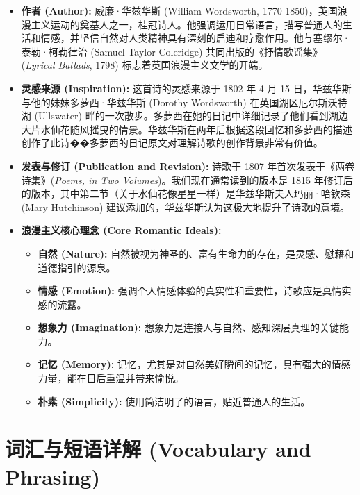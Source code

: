 \documentclass[12pt, a4paper]{article}
\begin{document}
\begin{itemize}
    \item \textbf{作者 (Author):} 威廉·华兹华斯 (William Wordsworth, 1770-1850)，英国浪漫主义运动的奠基人之一，桂冠诗人。他强调运用日常语言，描写普通人的生活和情感，并坚信自然对人类精神具有深刻的启迪和疗愈作用。他与塞缪尔·泰勒·柯勒律治 (Samuel Taylor Coleridge) 共同出版的《抒情歌谣集》(\textit{Lyrical Ballads}, 1798) 标志着英国浪漫主义文学的开端。
    \item \textbf{灵感来源 (Inspiration):} 这首诗的灵感来源于 1802 年 4 月 15 日，华兹华斯与他的妹妹多萝西·华兹华斯 (Dorothy Wordsworth) 在英国湖区厄尔斯沃特湖 (Ullswater) 畔的一次散步。多萝西在她的日记中详细记录了他们看到湖边大片水仙花随风摇曳的情景。华兹华斯在两年后根据这段回忆和多萝西的描述创作了此诗��多萝西的日记原文对理解诗歌的创作背景非常有价值。
    \item \textbf{发表与修订 (Publication and Revision):} 诗歌于 1807 年首次发表于《两卷诗集》(\textit{Poems, in Two Volumes})。我们现在通常读到的版本是 1815 年修订后的版本，其中第二节（关于水仙花像星星一样）是华兹华斯夫人玛丽·哈钦森 (Mary Hutchinson) 建议添加的，华兹华斯认为这极大地提升了诗歌的意境。
    \item \textbf{浪漫主义核心理念 (Core Romantic Ideals):}
        \begin{itemize}
            \item \textbf{自然 (Nature):} 自然被视为神圣的、富有生命力的存在，是灵感、慰藉和道德指引的源泉。
            \item \textbf{情感 (Emotion):} 强调个人情感体验的真实性和重要性，诗歌应是真情实感的流露。
            \item \textbf{想象力 (Imagination):} 想象力是连接人与自然、感知深层真理的关键能力。
            \item \textbf{记忆 (Memory):} 记忆，尤其是对自然美好瞬间的记忆，具有强大的情感力量，能在日后重温并带来愉悦。
            \item \textbf{朴素 (Simplicity):} 使用简洁明了的语言，贴近普通人的生活。
        \end{itemize}
\end{itemize}

\section{词汇与短语详解 (Vocabulary and Phrasing)}
\end{document}
